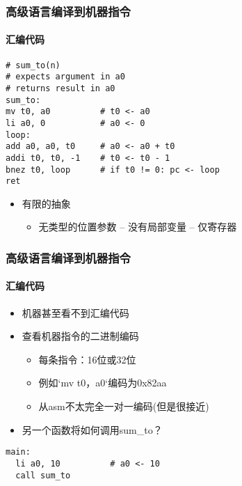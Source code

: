 \documentclass[UTF8]{ctexbeamer}
\begin{document}
\begin{frame}[fragile]
\frametitle{高级语言编译到机器指令}
\framesubtitle{汇编代码}
	
\begin{lstlisting}
# sum_to(n)
# expects argument in a0
# returns result in a0
sum_to:
mv t0, a0          # t0 <- a0
li a0, 0           # a0 <- 0
loop:
add a0, a0, t0     # a0 <- a0 + t0
addi t0, t0, -1    # t0 <- t0 - 1
bnez t0, loop      # if t0 != 0: pc <- loop
ret
\end{lstlisting}	

\begin{itemize}
	
	\item 有限的抽象
	\begin{itemize}
	  \item 无类型的位置参数 -- 没有局部变量 -- 仅寄存器
	\end{itemize}
		
\end{itemize}
	
\end{frame}



\begin{frame}[fragile]
\frametitle{高级语言编译到机器指令}
\framesubtitle{汇编代码}
	
\begin{itemize}
	
	\item 机器甚至看不到汇编代码
	\item 查看机器指令的二进制编码
	\begin{itemize}
		\item 每条指令：16位或32位
		\item 例如`mv t0，a0`编码为0x82aa
		\item 从asm不太完全一对一编码(但是很接近)
	\end{itemize}
	
	\item 另一个函数将如何调用sum\_to？
\end{itemize}	

\begin{lstlisting}
main:
  li a0, 10          # a0 <- 10
  call sum_to
\end{lstlisting}

	
\end{frame}
\end{document}
